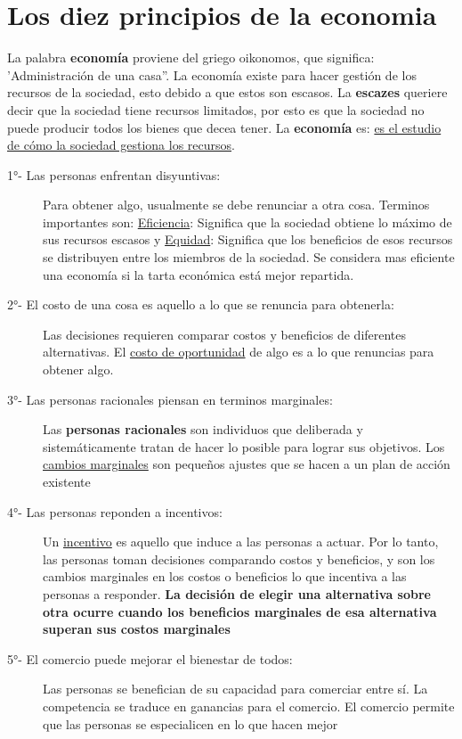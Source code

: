 


\section{Los diez principios de la economia}

La palabra \textbf{economía} proviene del griego oikonomos, que significa: 'Administración de una casa''. 
La economía existe para hacer gestión de los recursos de la sociedad, esto debido a que estos son escasos. 
La \textbf{escazes} queriere decir que la sociedad tiene recursos limitados, por esto es que la sociedad no puede
producir todos los bienes que decea tener. La {\bf economía} es: \underline{es el estudio de cómo la sociedad gestiona los recursos}.


\begin{description}
  \item [\large 1°- Las personas enfrentan disyuntivas:] Para obtener algo, usualmente se debe renunciar a otra cosa. Terminos importantes son: \underline{Eficiencia}: Significa que la sociedad obtiene lo máximo de sus recursos escasos y \underline{Equidad}: Significa que los beneficios de esos recursos se distribuyen entre los miembros de la sociedad. Se considera mas eficiente una economía si la tarta económica está mejor repartida.
  \item [\large 2°- El costo de una cosa es aquello a lo que se renuncia para obtenerla:] Las decisiones requieren comparar costos y beneficios de diferentes alternativas. El \underline{costo de oportunidad} de algo es a lo que renuncias para obtener algo.
  \item [\large 3°- Las personas racionales piensan en terminos marginales:] Las {\bf personas racionales} son individuos que deliberada y sistemáticamente tratan de hacer lo posible para lograr sus objetivos. Los \underline{cambios marginales} son pequeños ajustes que se hacen a un plan de acción existente
  \item [\large 4°- Las personas reponden a incentivos:] Un \underline{incentivo} es aquello que induce a las personas a actuar. Por lo tanto, las personas toman decisiones comparando costos y beneficios, y son los cambios marginales en los costos o beneficios lo que incentiva a las personas a responder. {\bf La decisión de elegir una alternativa sobre otra ocurre cuando los beneficios marginales de esa alternativa superan sus costos marginales}
  \item [\large 5°- El comercio puede mejorar el bienestar de todos:] Las personas se benefician de su capacidad para comerciar entre sí. La competencia se traduce en ganancias para el comercio. El comercio permite que las personas se especialicen en lo que hacen mejor

\end{description}
